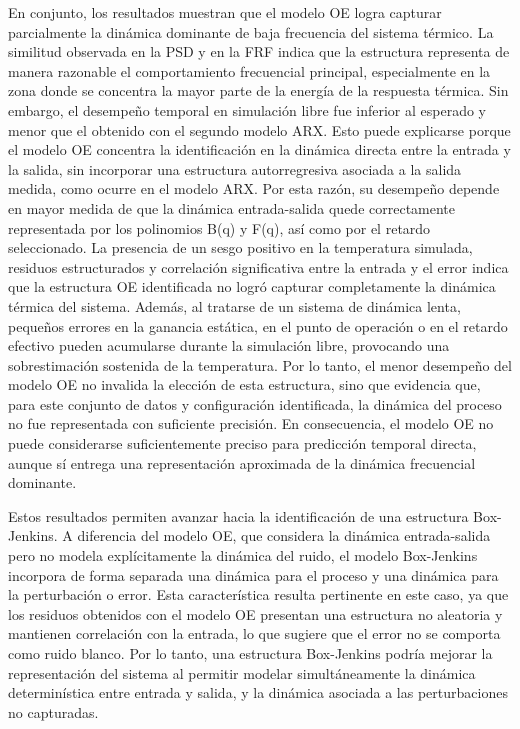 \documentclass[11pt]{report}
\begin{document}
En conjunto, los resultados muestran que el modelo OE logra capturar parcialmente la dinámica dominante de baja frecuencia del sistema térmico. La similitud observada en la PSD y en la FRF indica que la estructura representa de manera razonable el comportamiento frecuencial principal, especialmente en la zona donde se concentra la mayor parte de la energía de la respuesta térmica. Sin embargo, el desempeño temporal en simulación libre fue inferior al esperado y menor que el obtenido con el segundo modelo ARX. Esto puede explicarse porque el modelo OE concentra la identificación en la dinámica directa entre la entrada y la salida, sin incorporar una estructura autorregresiva asociada a la salida medida, como ocurre en el modelo ARX. Por esta razón, su desempeño depende en mayor medida de que la dinámica entrada-salida quede correctamente representada por los polinomios B(q) y F(q), así como por el retardo seleccionado. La presencia de un sesgo positivo en la temperatura simulada, residuos estructurados y correlación significativa entre la entrada y el error indica que la estructura OE identificada no logró capturar completamente la dinámica térmica del sistema. Además, al tratarse de un sistema de dinámica lenta, pequeños errores en la ganancia estática, en el punto de operación o en el retardo efectivo pueden acumularse durante la simulación libre, provocando una sobrestimación sostenida de la temperatura. Por lo tanto, el menor desempeño del modelo OE no invalida la elección de esta estructura, sino que evidencia que, para este conjunto de datos y configuración identificada, la dinámica del proceso no fue representada con suficiente precisión. En consecuencia, el modelo OE no puede considerarse suficientemente preciso para predicción temporal directa, aunque sí entrega una representación aproximada de la dinámica frecuencial dominante.

Estos resultados permiten avanzar hacia la identificación de una estructura Box-Jenkins. A diferencia del modelo OE, que considera la dinámica entrada-salida pero no modela explícitamente la dinámica del ruido, el modelo Box-Jenkins incorpora de forma separada una dinámica para el proceso y una dinámica para la perturbación o error. Esta característica resulta pertinente en este caso, ya que los residuos obtenidos con el modelo OE presentan una estructura no aleatoria y mantienen correlación con la entrada, lo que sugiere que el error no se comporta como ruido blanco. Por lo tanto, una estructura Box-Jenkins podría mejorar la representación del sistema al permitir modelar simultáneamente la dinámica determinística entre entrada y salida, y la dinámica asociada a las perturbaciones no capturadas.
\end{document}
